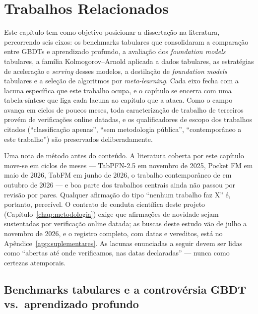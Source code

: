 \chapter{Trabalhos Relacionados}
\label{chap:related}

Este capítulo tem como objetivo posicionar a dissertação na literatura,
percorrendo seis eixos: os benchmarks tabulares que consolidaram a
comparação entre GBDTs e aprendizado profundo, a avaliação dos
\emph{foundation models} tabulares, a família Kolmogorov--Arnold aplicada
a dados tabulares, as estratégias de aceleração e \emph{serving} desses
modelos, a destilação de \emph{foundation models} tabulares e a seleção
de algoritmos por \emph{meta-learning}. Cada eixo fecha com a lacuna
específica que este trabalho ocupa, e o capítulo se encerra com uma
tabela-síntese que liga cada lacuna ao capítulo que a ataca. Como o campo
avança em ciclos de poucos meses, toda caracterização de trabalho de
terceiros provém de verificações online datadas, e os qualificadores de
escopo dos trabalhos citados (``classificação apenas'', ``sem metodologia
pública'', ``contemporâneo a este trabalho'') são preservados
deliberadamente.

Uma nota de método antes do conteúdo. A literatura coberta por este
capítulo move-se em ciclos de meses --- TabPFN-2.5 em
novembro de 2025, Pocket FM em maio de 2026, TabFM em junho de 2026, o
trabalho contemporâneo de \citet{jeong2026} em outubro de 2026 --- e boa
parte dos trabalhos centrais ainda não passou por revisão por pares.
Qualquer afirmação do tipo ``nenhum trabalho faz X'' é, portanto,
perecível. O contrato de conduta científica deste projeto
(Capítulo~\ref{chap:metodologia}) exige que afirmações de novidade sejam
sustentadas por verificação online datada; as buscas deste estudo vão
de julho a novembro de 2026, e o registro completo, com datas e
vereditos, está no Apêndice~\ref{app:suplementares}. As lacunas
enunciadas a seguir
devem ser lidas como ``abertas até onde verificamos, nas datas
declaradas'' --- nunca como certezas atemporais.

\section{Benchmarks tabulares e a controvérsia GBDT vs.\ aprendizado profundo}
\label{sec:rel-benchmarks}

